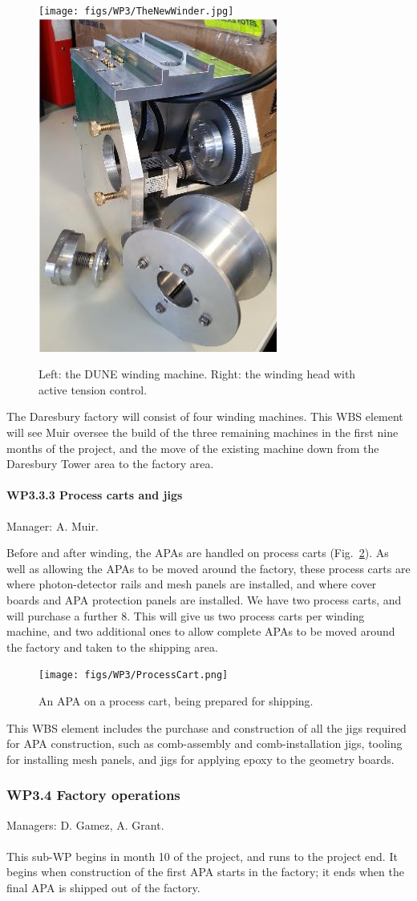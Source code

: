 \begin{figure}
    \centering
    \texttt{[image: figs/WP3/TheNewWinder.jpg]}
    \includegraphics[height=0.3\textwidth]{figs/WP3/ActiveTensionHead.png}
    \caption{Left: the DUNE winding machine. Right: the winding head with active tension control.}
    \label{fig:WindingMachine}
\end{figure}

The Daresbury factory will consist of four winding machines. This WBS element will see Muir oversee the build of the three remaining machines in the first nine months of the project, and the move of the existing machine down from the Daresbury Tower area to the factory area.

\paragraph{WP3.3.3 Process carts and jigs} Manager: A. Muir.

Before and after winding, the APAs are handled on process carts (Fig.~\ref{fig:ProcessCart}). As well as allowing the APAs to be moved around the factory, these process carts are where photon-detector rails and mesh panels are installed, and where cover boards and APA protection panels are installed. We have two process carts, and will purchase a further 8. This will give us two process carts per winding machine, and two additional ones to allow complete APAs to be moved around the factory and taken to the shipping area.

\begin{figure}
    \centering
    \texttt{[image: figs/WP3/ProcessCart.png]}
    \caption{An APA on a process cart, being prepared for shipping.}
    \label{fig:ProcessCart}
\end{figure}

This WBS element includes the purchase and construction of all the jigs required for APA construction, such as comb-assembly and comb-installation jigs, tooling for installing mesh panels, and jigs for applying epoxy to the geometry boards.

\subsubsection{WP3.4 Factory operations} Managers: D. Gamez, A. Grant.\\
\\ This sub-WP begins in month 10 of the project, and runs to the project end. It begins when construction of the first APA starts in the factory; it ends when the final APA is shipped out of the factory.

